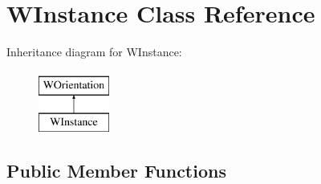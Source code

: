 \hypertarget{class_w_instance}{}\section{W\+Instance Class Reference}
\label{class_w_instance}
Inheritance diagram for W\+Instance\+:\begin{figure}[H]
\begin{center}
\leavevmode
\includegraphics[height=2.000000cm]{class_w_instance}
\end{center}
\end{figure}
\subsection*{Public Member Functions}
